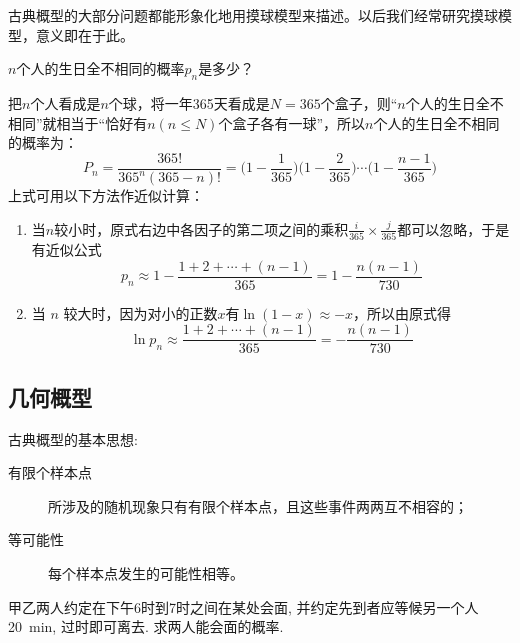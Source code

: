 \begin{note}
    古典概型的大部分问题都能形象化地用摸球模型来描述。以后我们经常研究摸球模型，意义即在于此。
\end{note}

\begin{example}[生日问题]
    $n$个人的生日全不相同的概率$p_n$是多少？
\end{example}
\begin{solution}
    把$n$个人看成是$n$个球，将一年365天看成是$N=365$个盒子，则“$n$个人的生日全不相同”就相当于“恰好有$n (n \le N)$个盒子各有一球”，所以$n$个人的生日全不相同的概率为：
    \[ P_n = \frac{365!}{365^n (365 - n)!} = \biggl(1 - \frac{1}{365}\biggr) \biggl(1 - \frac{2}{365}\biggr) \dotsb \biggl(1 - \frac{n - 1}{365}\biggr) \]
    上式可用以下方法作近似计算：
    \begin{enumerate}
        \item 当$n$较小时，原式右边中各因子的第二项之间的乘积$\frac{i}{365} \times \frac{j}{365}$都可以忽略，于是有近似公式
              \[ p_n \approx 1 - \frac{1 + 2 + \dotsb + (n - 1)}{365}  = 1 - \frac{n (n - 1)}{730}\]
        \item 当 $n$ 较大时，因为对小的正数$x$有$\ln (1-x) \approx -x$，所以由原式得
              \[ \ln p_n \approx \frac{1 + 2 + \dotsb + (n - 1)}{365} = -\frac{n (n - 1)}{730}\]
    \end{enumerate}
\end{solution}

\subsection{几何概型}

古典概型的基本思想:
\begin{description}
    \item[有限个样本点] 所涉及的随机现象只有有限个样本点，且这些事件两两互不相容的；
    \item[等可能性] 每个样本点发生的可能性相等。
\end{description}

\begin{example}[会商问题]
    甲乙两人约定在下午6时到7时之间在某处会面,
    并约定先到者应等候另一个人 \SI{20}{\minute},
    过时即可离去.
    求两人能会面的概率.
\end{example}

